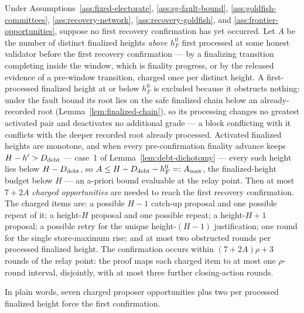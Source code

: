\begin{proposition}
\label{prop:opportunity-budget}
Under Assumptions~\ref{ass:fixed-electorate}, \ref{ass:sg-fault-bound},
\ref{ass:goldfish-committees},
\ref{ass:recovery-network}, \ref{ass:recovery-goldfish}, and
\ref{ass:frontier-opportunities}, suppose no first recovery confirmation
has yet occurred.  Let \(A\) be the number of distinct finalized
heights \emph{above \(h_F^0\)} first processed at some honest
validator before the first recovery confirmation --- by a finalizing
transition completing inside the window, which is finality progress, or
by the released evidence of a pre-window transition, charged once per
distinct height.  A first-processed finalized height at or below
\(h_F^0\) is excluded because it obstructs nothing: under the fault
bound its root lies on the safe finalized chain below an
already-recorded root (Lemma~\ref{lem:finalized-chain}), so its
processing changes no greatest activated pair and deactivates no
additional grade --- a block conflicting with it conflicts with the
deeper recorded root already processed.  Activated
finalized heights are monotone, and when every pre-confirmation finality
advance keeps \(H-h'>D_{\rm debt}\) --- case~1 of
Lemma~\ref{lem:debt-dichotomy} --- every such height lies below
\(H-D_{\rm debt}\), so \(A\leq H-D_{\rm debt}-h_F^0=:A_{\max}\),
the finalized-height budget below \(H\) --- an a-priori bound
evaluable at the relay point.  Then at most \(7+2A\) \emph{charged
opportunities} are needed to reach the first recovery confirmation.
The charged items are: a possible \(H-1\) catch-up proposal and one
possible repeat of it; a height-\(H\) proposal and one possible
repeat; a height-\(H+1\) proposal; a possible retry for the unique
height-\((H-1)\) justification; one round for the single
store-maximum rise; and at most two obstructed rounds per processed
finalized height.  The confirmation occurs within \((7+2A)\rho+3\)
rounds of the relay point: the proof maps each charged item to at most
one \(\rho\)-round interval, disjointly, with at most three further
closing-action rounds.

In plain words, seven charged proposer opportunities plus two per
processed finalized height force the first confirmation.
\end{proposition}

